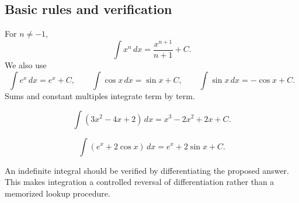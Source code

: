 \subsection{Basic rules and verification}

\begin{theorembox}
For $n\neq-1$,
\[
\int x^n\,dx=\frac{x^{n+1}}{n+1}+C.
\]
We also use
\[
\int e^x\,dx=e^x+C,
\qquad
\int \cos x\,dx=\sin x+C,
\qquad
\int \sin x\,dx=-\cos x+C.
\]
Sums and constant multiples integrate term by term.
\end{theorembox}

\begin{examplebox}
\[
\int (3x^2-4x+2)\,dx=x^3-2x^2+2x+C.
\]
\end{examplebox}

\begin{examplebox}
\[
\int (e^x+2\cos x)\,dx=e^x+2\sin x+C.
\]
\end{examplebox}

\begin{corebox}
An indefinite integral should be verified by differentiating the proposed answer. This makes integration a controlled reversal of differentiation rather than a memorized lookup procedure.
\end{corebox}
